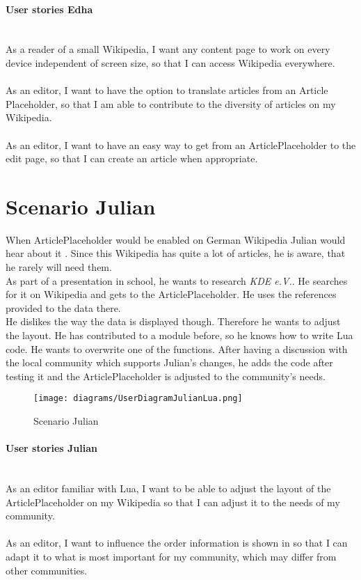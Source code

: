 \paragraph{User stories Edha} ~\\
As a reader of a small Wikipedia, I want any content page to work on every device independent of screen size, so that I can access Wikipedia everywhere. \\
\\
As an editor, I want to have the option to translate articles from an Article Placeholder, so that I am able to contribute to the diversity of articles on my Wikipedia. \\
\\
As an editor, I want to have an easy way to get from an ArticlePlaceholder to the edit page, so that I can create an article when appropriate. 

\section{Scenario Julian}
When ArticlePlaceholder would be enabled on German Wikipedia Julian would hear about it . Since this Wikipedia has quite a lot of articles, he is aware, that he rarely will need them. \\
As part of a presentation in school, he wants to research \textit{KDE e.V.}. He searches for it on Wikipedia and gets to the ArticlePlaceholder. He uses the references provided to the data there. \\
He dislikes the way the data is displayed though. Therefore he wants to adjust the layout. He has contributed to a module before, so he knows how to write Lua code. He wants to overwrite one of the functions. After having a discussion with the local community which supports Julian's changes, he adds the code after testing it and the ArticlePlaceholder is adjusted to the community's needs. 
\begin{figure}[H]
	\centering
	\texttt{[image: diagrams/UserDiagramJulianLua.png]}
	\caption{Scenario Julian}
	\label{fig:ScenarioJulian}
\end{figure}

\paragraph{User stories Julian} ~\\
As an editor familiar with Lua, I want to be able to adjust the layout of the ArticlePlaceholder on my Wikipedia so that I can adjust it to the needs of my community. \\
\\
As an editor, I want to influence the order information is shown in so that I can adapt it to what is most important for my community, which may differ from other communities.

